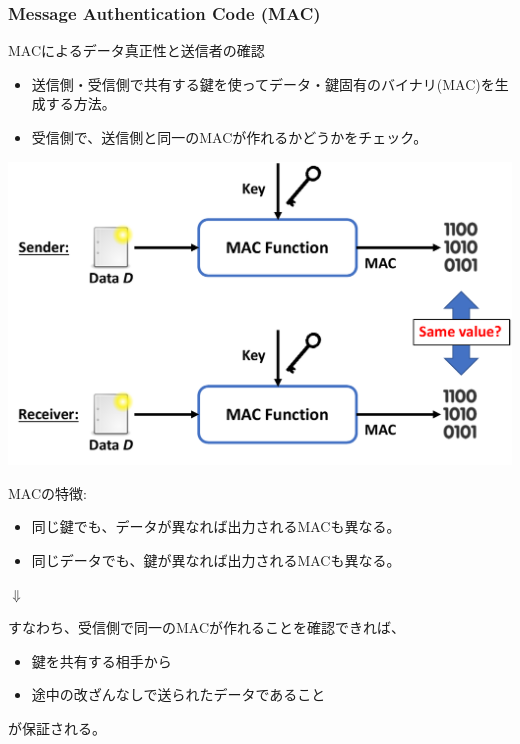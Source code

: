 \documentclass[12pt,dvipdfmx]{beamer}
\begin{document}
\begin{frame}
\frametitle{Message Authentication Code (MAC)}
\begin{block}{\small MACによるデータ真正性と送信者の確認}
\begin{itemize}
\item 送信側・受信側で共有する鍵を使って\alert{データ・鍵固有のバイナリ(MAC)}を生成する方法。
\item 受信側で、\alert{送信側と同一のMACが作れるかどうか}をチェック。
\end{itemize}
\end{block}
\begin{center}
 \includegraphics[width=0.7\linewidth]{Figs/mac-flow01.pdf}
\end{center}
\end{frame}
\begin{frame}
MACの特徴:
\begin{itemize}
 \item 同じ鍵でも、データが異なれば出力されるMACも異なる。
 \item 同じデータでも、鍵が異なれば出力されるMACも異なる。
\end{itemize}
\begin{center}
 $\Downarrow$
\end{center}
すなわち、受信側で同一のMACが作れることを確認できれば、\\
\begin{itemize}
 \item \alert{鍵を共有する相手}から
 \item \alert{途中の改ざんなしで送られたデータ}であること
\end{itemize}
が保証される。
\end{frame}
\end{document}
